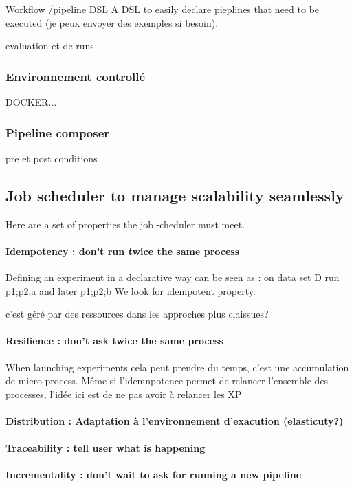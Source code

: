 \documentclass{llncs}
\begin{document}
Workflow /pipeline DSL
A DSL to easily declare pieplines that need to be executed (je peux envoyer des exemples si besoin). 

evaluation et de runs

\subsubsection{Environnement controllé}
DOCKER...


\subsubsection{Pipeline composer}
pre et post conditions


\subsection{Job scheduler to manage scalability seamlessly}

Here are a set of properties the job -cheduler must meet.

\paragraph{Idempotency : don't run twice the same process} Defining an experiment in a declarative way can be seen as : on data set D run p1;p2;a and later p1;p2;b
We look for idempotent property.

c'est géré par des ressources dans les approches plus claissues?

\paragraph{Resilience : don't ask twice the same process}
When launching experiments cela peut prendre du temps, c'est une accumulation de micro process. Même si l'idemnpotence permet de relancer l'ensemble des processes, l'idée ici est de ne pas avoir à relancer les XP
\paragraph{Distribution  : Adaptation à l'environnement d'exacution (elasticuty?)}
\paragraph{Traceability  : tell user what is happening }
\paragraph{Incrementality  : don't wait to ask for running a new pipeline }
\end{document}
